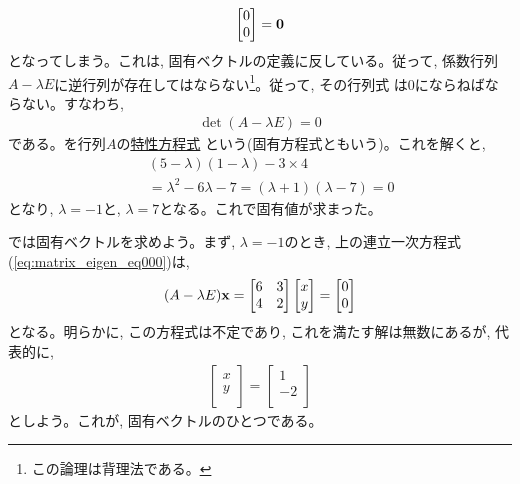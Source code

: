\begin{exmpl}
\begin{eqnarray}
\begin{bmatrix}
0 \\
0 \\
\end{bmatrix}={\bf 0}
\end{eqnarray}
となってしまう。これは, 固有ベクトルの定義に反している。従って, 
係数行列$A-\lambda E$に逆行列が存在してはならない\footnote{この論理は背理法である。}。従って, その行列式
は0にならねばならない。すなわち, 
\begin{eqnarray}
\det(A-\lambda E)=0\label{eq:matrix_tokusei}
\end{eqnarray}
である。を行列$A$の\underline{特性方程式} 
という(固有方程式ともいう)。これを解くと, 
\begin{eqnarray*}
&&(5-\lambda)(1-\lambda)-3\times4\\
&&=\lambda^2-6\lambda-7=(\lambda+1)(\lambda-7)=0
\end{eqnarray*}
となり, $\lambda=-1$と, $\lambda=7$となる。これで固有値が求まった。

では固有ベクトルを求めよう。まず, $\lambda=-1$のとき, 上の連立一次方程式(\ref{eq:matrix_eigen_eq000})は, 
\begin{eqnarray}
(A-\lambda E){\bf x}=
\begin{bmatrix}
6          & 3 \\
4          & 2 \\
\end{bmatrix}
\begin{bmatrix}
x \\
y \\
\end{bmatrix}
=\begin{bmatrix}
0 \\
0 \\
\end{bmatrix}\end{eqnarray}
となる。明らかに, この方程式は不定であり, これを満たす解は無数にあるが, 代表的に, 
\begin{eqnarray}
\begin{bmatrix}
x \\
y \\
\end{bmatrix}
=\begin{bmatrix}
1 \\
-2 \\
\end{bmatrix}
\end{eqnarray}
としよう。これが, 固有ベクトルのひとつである。


\end{exmpl}
